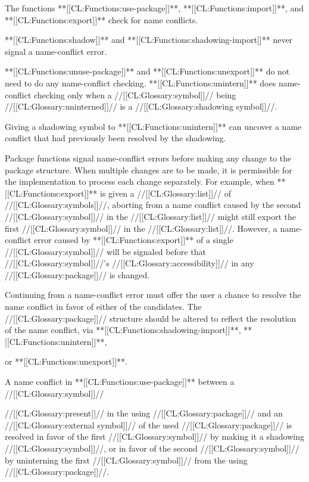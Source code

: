 \itemitem{--} 
The functions **[[CL:Functions:use-package]]**, **[[CL:Functions:import]]**, and 
**[[CL:Functions:export]]** check for name conflicts.  


\itemitem{--} 
**[[CL:Functions:shadow]]** and **[[CL:Functions:shadowing-import]]** 
never signal a name-conflict error.


\itemitem{--} 




**[[CL:Functions:unuse-package]]** and **[[CL:Functions:unexport]]**
do not need to do any name-conflict checking.
**[[CL:Functions:unintern]]** does name-conflict checking only when a //[[CL:Glossary:symbol]]// 
being //[[CL:Glossary:uninterned]]// is a //[[CL:Glossary:shadowing symbol]]//.


\itemitem{--} 
Giving a shadowing symbol to **[[CL:Functions:unintern]]** 
can uncover a name conflict that had
previously been resolved by the shadowing.  






  \itemitem{--} 
  Package functions signal name-conflict errors  before making any
  change to the package structure.  When multiple changes are to be made,
  it is
  permissible for the implementation to process each change separately.
  For example, when **[[CL:Functions:export]]** is given a 
//[[CL:Glossary:list]]// of 
//[[CL:Glossary:symbols]]//,
  aborting from a name
  conflict caused by the second //[[CL:Glossary:symbol]]// 
  in the //[[CL:Glossary:list]]// might still export the
  first //[[CL:Glossary:symbol]]// in the //[[CL:Glossary:list]]//.  
  However, a name-conflict error caused by **[[CL:Functions:export]]**
  of a single //[[CL:Glossary:symbol]]// will be signaled before
  that //[[CL:Glossary:symbol]]//'s //[[CL:Glossary:accessibility]]// in any //[[CL:Glossary:package]]// is changed.


\itemitem{--} 
Continuing from a name-conflict error must offer the user a chance to
resolve the name conflict in favor of either of the candidates.  The
//[[CL:Glossary:package]]// 
structure should be altered to reflect the resolution of the
name conflict, via **[[CL:Functions:shadowing-import]]**, 
**[[CL:Functions:unintern]]**,

or **[[CL:Functions:unexport]]**.


\itemitem{--} 
A name conflict in **[[CL:Functions:use-package]]** between a //[[CL:Glossary:symbol]]// 

//[[CL:Glossary:present]]// in the using //[[CL:Glossary:package]]// and an //[[CL:Glossary:external symbol]]// of the used 
//[[CL:Glossary:package]]// is resolved in favor of the first //[[CL:Glossary:symbol]]// by making it a
shadowing //[[CL:Glossary:symbol]]//, or in favor of the second //[[CL:Glossary:symbol]]// by uninterning
the first //[[CL:Glossary:symbol]]// from the using //[[CL:Glossary:package]]//. 


